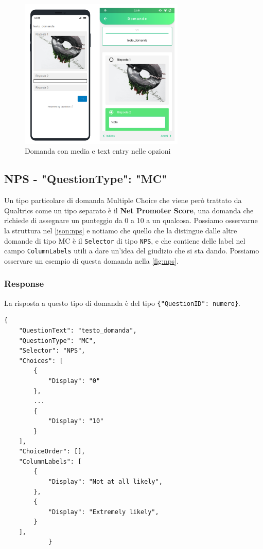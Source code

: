 \begin{figure}[ht!]
\centering
\includegraphics[width=0.7\textwidth]{img/mc_media}
\caption{Domanda con media e text entry nelle opzioni}
\label{fig:mc_media}
\end{figure}

\clearpage
\subsection{NPS - "QuestionType": "MC"}
Un tipo particolare di domanda Multiple Choice che viene però trattato da Qualtrics come un tipo separato è il \textbf{Net Promoter Score}, una domanda che richiede di assegnare un punteggio da 0 a 10 a un qualcosa. Possiamo osservarne la struttura nel \autoref{json:nps} e notiamo che quello che la distingue dalle altre domande di tipo MC è il \texttt{Selector} di tipo \texttt{NPS}, e che contiene delle label nel campo \texttt{ColumnLabels} utili a dare un'idea del giudizio che si sta dando. Possiamo osservare un esempio di questa domanda nella \autoref{fig:nps}.

\subsubsection{Response}
La risposta a questo tipo di domanda è del tipo \texttt{\{"QuestionID": numero\}}.

\begin{json}
\begin{verbatim}
{
    "QuestionText": "testo_domanda",
    "QuestionType": "MC",
    "Selector": "NPS",
    "Choices": [
        {
            "Display": "0"
        },
        ...
        {
            "Display": "10"
        }
    ],
    "ChoiceOrder": [],
    "ColumnLabels": [
        {
            "Display": "Not at all likely",
        },
        {
            "Display": "Extremely likely",
        }
    ],
            }
\end{verbatim}
\caption{Oggetto domanda NPS}
\label{json:nps}
\end{json}

